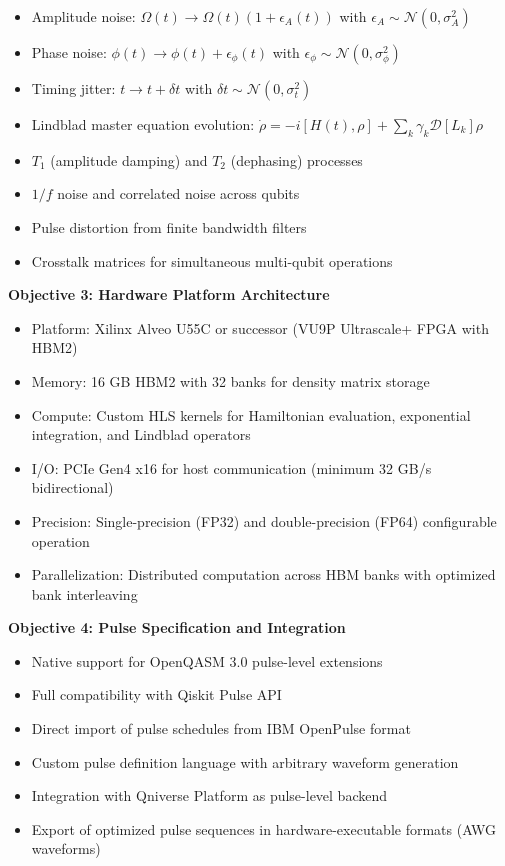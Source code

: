 \documentclass[12pt,a4paper]{article}
\begin{document}
\begin{itemize}[noitemsep]
\item Amplitude noise: $\Omega(t) \rightarrow \Omega(t)(1 + \epsilon_A(t))$ with $\epsilon_A \sim \mathcal{N}(0, \sigma_A^2)$
\item Phase noise: $\phi(t) \rightarrow \phi(t) + \epsilon_\phi(t)$ with $\epsilon_\phi \sim \mathcal{N}(0, \sigma_\phi^2)$
\item Timing jitter: $t \rightarrow t + \delta t$ with $\delta t \sim \mathcal{N}(0, \sigma_t^2)$
\item Lindblad master equation evolution: $\dot{\rho} = -i[H(t), \rho] + \sum_k \gamma_k \mathcal{D}[L_k]\rho$
\item $T_1$ (amplitude damping) and $T_2$ (dephasing) processes
\item $1/f$ noise and correlated noise across qubits
\item Pulse distortion from finite bandwidth filters
\item Crosstalk matrices for simultaneous multi-qubit operations
\end{itemize}

\textbf{Objective 3: Hardware Platform Architecture}

\begin{itemize}[noitemsep]
\item Platform: Xilinx Alveo U55C or successor (VU9P Ultrascale+ FPGA with HBM2)
\item Memory: 16 GB HBM2 with 32 banks for density matrix storage
\item Compute: Custom HLS kernels for Hamiltonian evaluation, exponential integration, and Lindblad operators
\item I/O: PCIe Gen4 x16 for host communication (minimum 32 GB/s bidirectional)
\item Precision: Single-precision (FP32) and double-precision (FP64) configurable operation
\item Parallelization: Distributed computation across HBM banks with optimized bank interleaving
\end{itemize}

\textbf{Objective 4: Pulse Specification and Integration}

\begin{itemize}[noitemsep]
\item Native support for OpenQASM 3.0 pulse-level extensions
\item Full compatibility with Qiskit Pulse API
\item Direct import of pulse schedules from IBM OpenPulse format
\item Custom pulse definition language with arbitrary waveform generation
\item Integration with Qniverse Platform as pulse-level backend
\item Export of optimized pulse sequences in hardware-executable formats (AWG waveforms)
\end{itemize}
\end{document}
